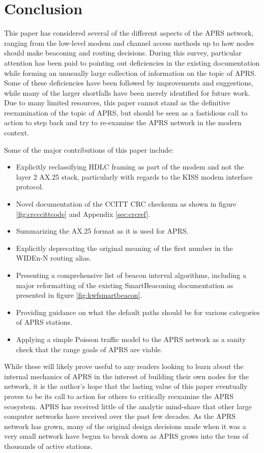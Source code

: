 \chapter{Conclusion}

This paper has considered several of the different aspects of the APRS network,
ranging from the low-level modem and channel access methods up to
how nodes should make beaconing and routing decisions.
During this survey, particular attention has been paid to pointing out
deficiencies in the existing documentation while forming 
an unusually large collection of information on the topic of APRS.
Some of these deficiencies have been followed by improvements
and suggestions, while many of the larger shortfalls have
been merely identified for future work.
Due to many limited resources, this paper cannot stand as the definitive
reexamination of the topic of APRS,
but should be seen as a fastidious call to action to step back and
try to re-examine the APRS network in the modern context.

Some of the major contributions of this paper include:
\begin{itemize}
	\item Explicitly reclassifying HDLC framing as part of the modem
		and not the layer 2 AX.25 stack, particularly with
		regards to the KISS modem interface protocol.
	\item Novel documentation of the CCITT CRC checksum as shown in
		figure \ref{fig:crcccittcode} and Appendix \ref{sec:crcref}.
	\item Summarizing the AX.25 format as it is used for APRS.
	\item Explicitly deprecating the original meaning of the first number
		in the WIDEn-N routing alias.
	\item Presenting a comprehensive list of beacon interval
		algorithms, including a major reformatting of the
		existing SmartBeaconing documentation as presented
		in figure \ref{fig:kwfsmartbeacon}.
	\item Providing guidance on what the default paths should be for
		various categories of APRS stations.
	\item Applying a simple Poisson traffic model to the APRS network
		as a sanity check that the range goals of APRS are viable.
\end{itemize}

While these will likely prove useful to any readers looking to learn about
the internal mechanics of APRS in the interest of building their own nodes
for the network, it is the author's hope that the lasting value of this paper
eventually proves to be its call to action for others to critically 
reexamine the APRS ecosystem.
APRS has received little of the analytic mind-share that other large
computer networks have received over the past few decades.
As the APRS network has grown, many
of the original design decisions made when it was a very small network
have begun to break down as APRS grows into the tens of thousands of active stations.

